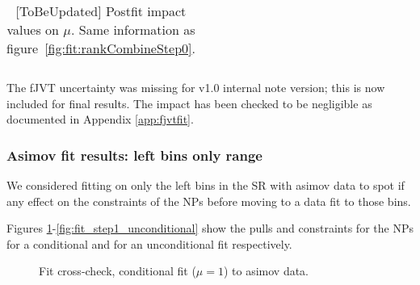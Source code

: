 \begin{table}[htbp]
\begin{tabular}{|c|c|c|c|}

  \end{tabular}
  \caption{[ToBeUpdated] Postfit impact values on $\mu$. Same information as figure~\ref{fig:fit:rankCombineStep0}.}
  \label{tab:rankingPlotValues}
\end{table}



The fJVT uncertainty was missing for v1.0 internal note version; this is now included for final results. 
The impact has been checked to be negligible as documented in Appendix \ref{app:fjvtfit}.

\clearpage
\subsubsection{Asimov fit results: left bins only range}

We considered fitting on only the left bins in the SR with asimov data 
to spot if any effect on the constraints of the NPs before moving to a data fit to those bins.

Figures \ref{fig:fit_step1_conditional}-\ref{fig:fit_step1_unconditional}
show the pulls and constraints for the NPs for a conditional and for an unconditional fit respectively.

\begin{figure}[ht]
      \centering
       \caption{Fit cross-check, conditional fit ($\mu=1$) to asimov data.}
       \label{fig:fit_step1_conditional}
\end{figure}

